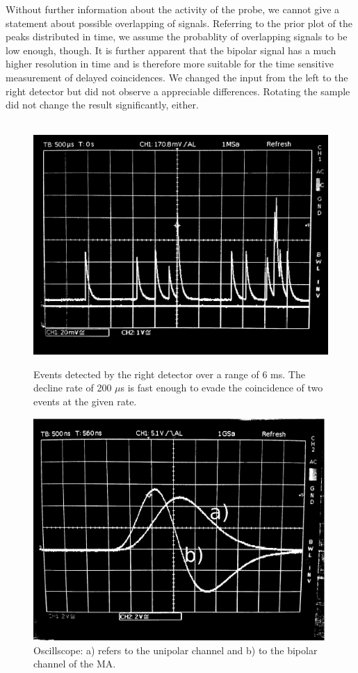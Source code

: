 Without further information about the activity of the probe, we cannot give a statement about 
possible overlapping of signals. Referring to the prior plot of the peaks distributed in time, we 
assume the probablity of overlapping signals to be low enough, though. 
It is further apparent that the bipolar signal has a much higher resolution in time and is therefore 
more suitable for the time sensitive measurement of delayed coincidences. 
We changed the input from the left to the right detector but did not observe a appreciable differences.
Rotating the sample did not change the result significantly, either.  
\\\\
\begin{figure}
    \begin{centering}
        \caption{
            Events detected by the right detector over a range of 6 ms. 
            The decline rate of 200 $\mu$s is fast enough to evade the 
            coincidence of two events at the given rate. 
            }
        \includegraphics[width=0.45\linewidth]{figures/osci_signal}
        \label{fig:osci_signal}
    \end{centering}
\end{figure}

\begin{figure}[htpb]
    \centering
    \includegraphics[width=0.8\linewidth]{figures/uni_bipolar2}
    \caption{Oscillscope: a) refers to the unipolar channel and b) to 
        the bipolar channel of the MA.}
    \label{fig:uni_bipolar}
\end{figure}

